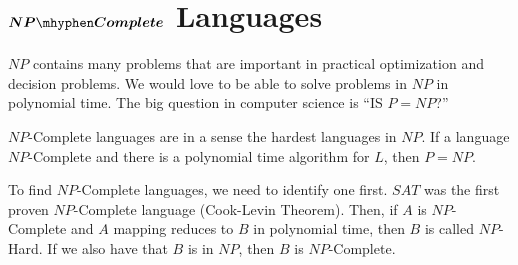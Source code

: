 \section*{$\boldsymbol{NP\mhyphen Complete}$ Languages}
$NP$ contains many problems that are important in practical optimization and decision problems.  We would love to be able to solve problems in $NP$ in polynomial time.  The big question in computer science is ``IS $P=NP$?''

$NP$-Complete languages are in a sense the hardest languages in $NP$.  If a language $NP$-Complete and there is a polynomial time algorithm for $L$, then $P=NP$.


To find $NP$-Complete languages, we need to identify one first.  $SAT$ was the first proven $NP$-Complete language (Cook-Levin Theorem).  Then, if $A$ is $NP$-Complete and $A$ mapping reduces to $B$ in polynomial time, then $B$ is called $NP$-Hard.  If we also have that $B$ is in $NP$, then $B$ is $NP$-Complete.




